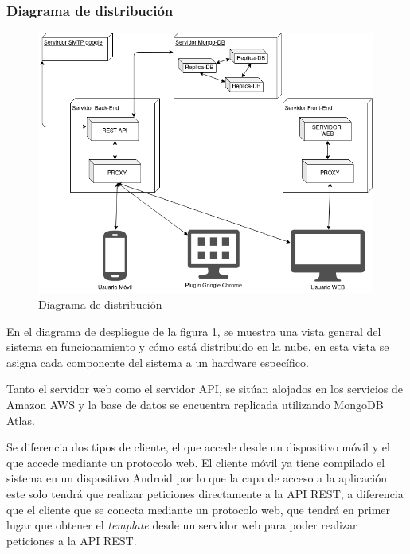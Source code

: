 \documentclass{article}
\begin{document}

\subsubsection*{Diagrama de distribución}

\begin{figure}[H]
   \centering
       \includegraphics[width=0.99\textwidth]{../images/despliegue2.png}
   \caption{Diagrama de distribución}
   \label{despliegue}
\end{figure}

En el diagrama de despliegue de la figura \ref{despliegue}, se muestra una vista general del sistema en funcionamiento y cómo está distribuido en la nube, en esta vista se asigna cada componente del sistema a un hardware específico.

Tanto el servidor web como el servidor API, se sitúan alojados en los servicios de Amazon AWS y la base de datos se encuentra replicada utilizando MongoDB Atlas.

Se diferencia dos tipos de cliente, el que accede desde un dispositivo móvil y el que accede mediante un protocolo web. El cliente móvil ya tiene compilado el sistema en un dispositivo Android por lo que la capa de acceso a la aplicación este solo tendrá que realizar peticiones directamente a la API REST, a diferencia que el cliente que se conecta mediante un protocolo web, que tendrá en primer lugar que obtener el \textit{template} desde un servidor web para poder realizar peticiones a la API REST.
\end{document}
